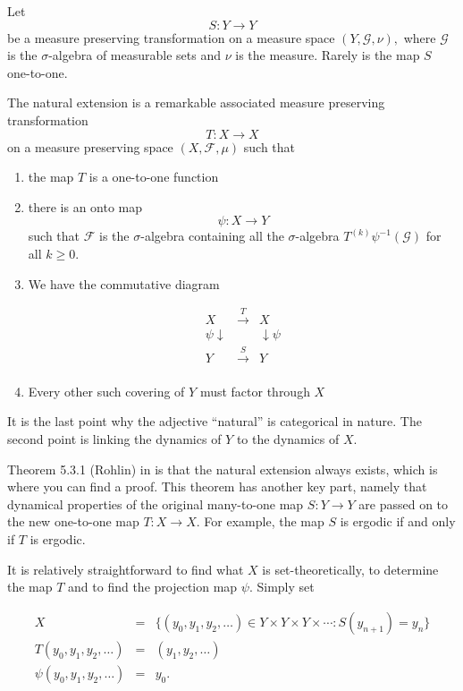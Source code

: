 \documentclass[12pt,oneside,openany]{article}
\begin{document}
Let 
$$S:Y\rightarrow Y$$
be a measure preserving transformation on a measure space $(Y, \mathcal{G}, \nu),$ where $\mathcal{G}$ is the $\sigma$-algebra of measurable sets and $\nu$ is the measure. 
Rarely is the map $S$ one-to-one. 

The natural extension is a remarkable associated measure preserving transformation
$$T:X\rightarrow X$$
on a measure preserving space $(X, \mathcal{F}, \mu)$  such that 

\begin{enumerate}
\item the map $T$ is  a one-to-one function
\item there is an onto map 
$$\psi:X\rightarrow Y$$
such that  $\mathcal{F}$ is the $\sigma$-algebra containing all the $\sigma$-algebra $T^{(k)} \psi^{-1} (\mathcal{G})$ for all $k\geq 0.$
\item We have the commutative diagram

$$\begin{matrix} 
X & \xrightarrow{T} & X \\
\psi \downarrow &  & \downarrow \psi \\
Y & \xrightarrow{S} & Y \\
\end{matrix}$$

\item Every other such covering of $Y$ must factor through $X$


\end{enumerate}

It is the last point why the adjective ``natural'' is categorical in nature.
The second point is  linking the dynamics of $Y$ to the dynamics of $X$.

Theorem 5.3.1 (Rohlin) in \cite{Dajani-Kalle} is that the natural extension always exists, which is  where you can find a proof.  This theorem has another key part, namely that dynamical properties of the original many-to-one map $S:Y\rightarrow Y$ are passed on to the new one-to-one map $T:X   \rightarrow X.$  For example, the map $S$ is ergodic if and only if $T$ is ergodic.

It is relatively straightforward to find what $X$ is set-theoretically, to determine the map $T$ and to find the projection map $\psi$.  Simply set  

\begin{eqnarray*}
X&=& \{ (y_0, y_1, y_2, \ldots )\in Y\times Y \times Y \times \cdots : S(y_{n+1}) =y_n \}   \\
T(y_0, y_1, y_2, \ldots ) &=& (y_1, y_2, \ldots ) \\
\psi(y_0, y_1, y_2, \ldots ) &=& y_0.
\end{eqnarray*}
\end{document}
